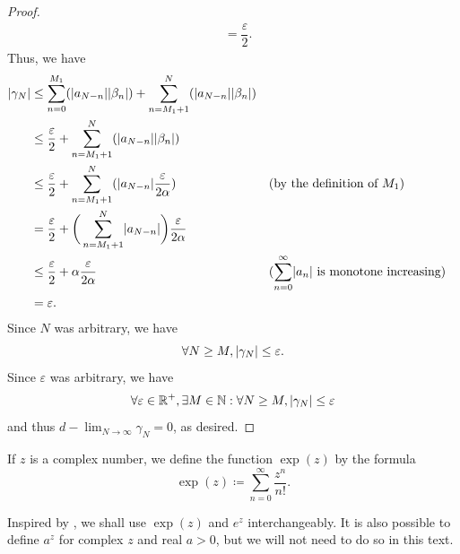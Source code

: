 \begin{proof}
\begin{align*}
                                                       & = \dfrac{\varepsilon}{2}.
  \end{align*}
  Thus, we have
  \begin{align*}
    \abs{\gamma_N} & \leq \sum_{n = 0}^{M_1} (\abs{a_{N - n}} \abs{\beta_n}) + \sum_{n = M_1 + 1}^N (\abs{a_{N - n}} \abs{\beta_n})                                                                        \\
                   & \leq \dfrac{\varepsilon}{2} + \sum_{n = M_1 + 1}^N (\abs{a_{N - n}} \abs{\beta_n})                                                                                                    \\
                   & \leq \dfrac{\varepsilon}{2} + \sum_{n = M_1 + 1}^N (\abs{a_{N - n}} \dfrac{\varepsilon}{2 \alpha})             &  & \text{(by the definition of \(M_1\))}                             \\
                   & = \dfrac{\varepsilon}{2} + \bigg(\sum_{n = M_1 + 1}^N \abs{a_{N - n}}\bigg) \dfrac{\varepsilon}{2 \alpha}                                                                             \\
                   & \leq \dfrac{\varepsilon}{2} + \alpha \dfrac{\varepsilon}{2 \alpha}                                             &  & \text{(\(\sum_{n = 0}^\infty \abs{a_n}\) is monotone increasing)} \\
                   & = \varepsilon.
  \end{align*}
  Since \(N\) was arbitrary, we have
  \[
    \forall N \geq M, \left\lvert\gamma_N\right\rvert \leq \varepsilon.
  \]
  Since \(\varepsilon\) was arbitrary, we have
  \[
    \forall \varepsilon \in \mathbb{R}^+, \exists M \in \mathbb{N} : \forall N \geq M, \left\lvert\gamma_N\right\rvert \leq \varepsilon
  \]
  and thus \(d - \lim_{N \to \infty} \gamma_N = 0\), as desired.
\end{proof}

\begin{defn}\label{ii:4.6.15}
  If \(z\) is a complex number, we define the function \(\exp(z)\) by the formula
  \[
    \exp(z) \coloneqq \sum_{n = 0}^\infty \dfrac{z^n}{n!}.
  \]
\end{defn}

\begin{note}
  Inspired by , we shall use \(\exp(z)\) and \(e^z\) interchangeably.
  It is also possible to define \(a^z\) for complex \(z\) and real \(a > 0\), but we will not need to do so in this text.
\end{note}

